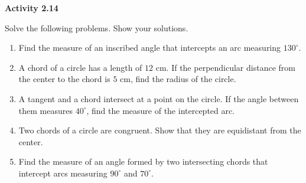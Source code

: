 \vspace{0.3ex}
\noindent\textbf{Activity 2.14}

\vspace{0.2ex}

Solve the following problems. Show your solutions.

\begin{enumerate}
    \item Find the measure of an inscribed angle that intercepts an arc measuring $130^\circ$.
    \item A chord of a circle has a length of $12$ cm. If the perpendicular distance from the center to the chord is $5$ cm, find the radius of the circle.
    \item A tangent and a chord intersect at a point on the circle. If the angle between them measures $40^\circ$, find the measure of the intercepted arc.
    \item Two chords of a circle are congruent. Show that they are equidistant from the center.
    \item Find the measure of an angle formed by two intersecting chords that intercept arcs measuring $90^\circ$ and $70^\circ$.
\end{enumerate}
